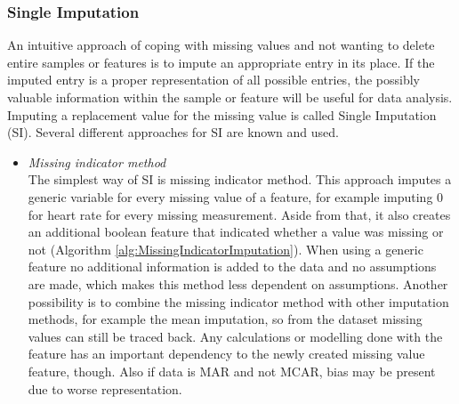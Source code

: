 \documentclass[10pt,a4paper]{report}
\begin{document}
	\subsubsection{Single Imputation}
	\label{MVsubsec:SingleImputation}
	
	An intuitive approach of coping with missing values and not wanting to delete entire samples or features is to impute an appropriate entry in its place. If the imputed entry is a proper representation of all possible entries, the possibly valuable information within the sample or feature will be useful for data analysis. Imputing a replacement value for the missing value is called Single Imputation (SI). Several different approaches for SI are known and used.\cite{haukoos2007advanced, donders2006gentle, myrtveit2001analyzing}
	
	
	\begin{itemize}
		\item \textit{Missing indicator method} \\
		The simplest way of SI is missing indicator method. This approach imputes a generic variable for every missing value of a feature, for example imputing $0$ for heart rate for every missing measurement. Aside from that, it also creates an additional boolean feature that indicated whether a value was missing or not (Algorithm \ref{alg:MissingIndicatorImputation}). When using a generic feature no additional information is added to the data and no assumptions are made, which makes this method less dependent on assumptions\cite{pedersen2017missing}. Another possibility is to combine the missing indicator method with other imputation methods, for example the mean imputation, so from the dataset missing values can still be traced back. Any calculations or modelling done with the feature has an important dependency to the newly created missing value feature, though. Also if data is MAR and not MCAR, bias may be present due to worse representation\cite{donders2006gentle}.	
		

\end{itemize}
\end{document}
